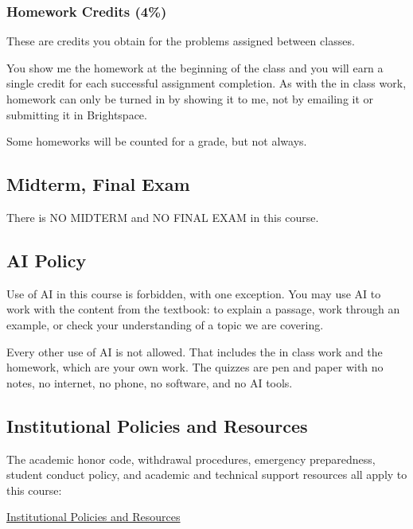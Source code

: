 \documentclass[
  letterpaper,
  DIV=11,
  numbers=noendperiod]{scrartcl}
\begin{document}
\subsubsection{Homework Credits (4\%)}\label{homework-credits-4}

These are credits you obtain for the problems assigned between classes.

You show me the homework at the beginning of the class and you will earn
a single credit for each successful assignment completion. As with the
in class work, homework can only be turned in by showing it to me, not
by emailing it or submitting it in Brightspace.

Some homeworks will be counted for a grade, but not always.

\subsection{Midterm, Final Exam}\label{midterm-final-exam}

There is NO MIDTERM and NO FINAL EXAM in this course.

\subsection{AI Policy}\label{ai-policy}

Use of AI in this course is forbidden, with one exception. You may use
AI to work with the content from the textbook: to explain a passage,
work through an example, or check your understanding of a topic we are
covering.

Every other use of AI is not allowed. That includes the in class work
and the homework, which are your own work. The quizzes are pen and paper
with no notes, no internet, no phone, no software, and no AI tools.

\subsection{Institutional Policies and
Resources}\label{institutional-policies-and-resources}

The academic honor code, withdrawal procedures, emergency preparedness,
student conduct policy, and academic and technical support resources all
apply to this course:

\href{https://calvinw.github.io/FIT-courses/shared/InstitutionalPoliciesAndResources.html}{Institutional
Policies and Resources}
\end{document}
